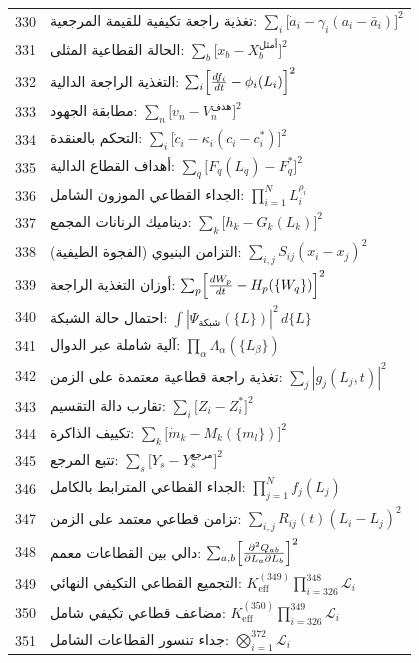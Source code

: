 \documentclass[11pt,a4paper]{article}
\begin{document}
\begin{longtable}{r l}
		330 & تغذية راجعة تكيفية للقيمة المرجعية: $\sum_i\bigl[\dot a_i - \gamma_i(a_i - \bar a_i)\bigr]^2$ \\
		331 & الحالة القطاعية المثلى: $\sum_b\bigl[x_b - X_b^{\text{أمثل}}\bigr]^2$ \\
		332 & التغذية الراجعة الدالية: $\sum_i\Bigl[\frac{df_i}{dt} - \phi_i(L_i)\Bigr]^2$ \\
		333 & مطابقة الجهود: $\sum_n\bigl[v_n - V_n^{\text{هدف}}\bigr]^2$ \\
		334 & التحكم بالعنقدة: $\sum_i\bigl[\dot c_i - \kappa_i(c_i - c_i^*)\bigr]^2$ \\
		335 & أهداف القطاع الدالية: $\sum_q\bigl[F_q(L_q) - F_q^*\bigr]^2$ \\
		336 & الجداء القطاعي الموزون الشامل: $\prod_{i=1}^N L_i^{\rho_i}$ \\
		337 & ديناميك الرنانات المجمع: $\sum_k\bigl[h_k - G_k(L_k)\bigr]^2$ \\
		338 & التزامن البنيوي (الفجوة الطيفية): $\sum_{i,j}S_{ij}(x_i - x_j)^2$ \\
		339 & أوزان التغذية الراجعة: $\sum_p\Bigl[\frac{dW_p}{dt} - H_p(\{W_q\})\Bigr]^2$ \\
		340 & احتمال حالة الشبكة: $\int|\Psi_{\text{شبكة}}(\{L\})|^2\,d\{L\}$ \\
		341 & آلية شاملة عبر الدوال: $\prod_\alpha\Lambda_\alpha(\{L_\beta\})$ \\
		342 & تغذية راجعة قطاعية معتمدة على الزمن: $\sum_j|g_j(L_j,t)|^2$ \\
		343 & تقارب دالة التقسيم: $\sum_i\bigl[Z_i - Z_i^*\bigr]^2$ \\
		344 & تكييف الذاكرة: $\sum_k\bigl[\dot m_k - M_k(\{m_l\})\bigr]^2$ \\
		345 & تتبع المرجع: $\sum_s\bigl[Y_s - Y_s^{\text{مرجع}}\bigr]^2$ \\
		346 & الجداء القطاعي المترابط بالكامل: $\prod_{j=1}^N f_j(L_j)$ \\
		347 & تزامن قطاعي معتمد على الزمن: $\sum_{i,j}R_{ij}(t)(L_i - L_j)^2$ \\
		348 & دالي بين القطاعات معمم: $\sum_{a,b}\Bigl[\frac{\partial^2 Q_{ab}}{\partial L_a\partial L_b}\Bigr]^2$ \\
		349 & التجميع القطاعي التكيفي النهائي: $K^{(349)}_{\mathrm{eff}}\prod_{i=326}^{348}\mathcal{L}_i$ \\
		350 & مضاعف قطاعي تكيفي شامل: $K^{(350)}_{\mathrm{eff}}\prod_{i=326}^{349}\mathcal{L}_i$ \\
		351 & جداء تنسور القطاعات الشامل: $\bigotimes_{i=1}^{372}\mathcal{L}_i$ \\

\end{longtable}
\end{document}
